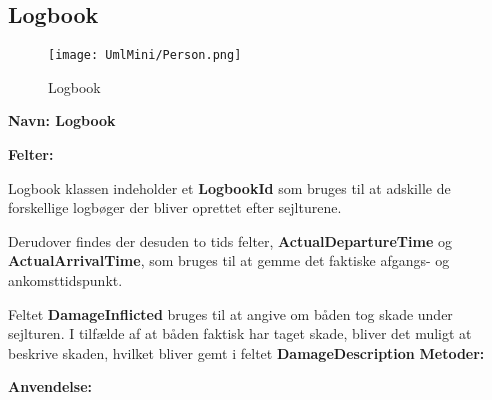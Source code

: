 \subsection*{Logbook}
\begin{wrapfigure}[9]{R}{0.25\textwidth}
    \label{img:logbook}
    \vspace{-20pt}
    \begin{center}
        \texttt{[image: UmlMini/Person.png]}
    \end{center}
    \vspace{-10pt}
    \caption{Logbook}
\end{wrapfigure}
\textbf{Navn: Logbook}

\textbf{Felter:}

Logbook klassen indeholder et \textbf{LogbookId} som bruges til at adskille de forskellige logbøger der bliver oprettet efter sejlturene. 

Derudover findes der desuden to tids felter, \textbf{ActualDepartureTime} og \textbf{ActualArrivalTime}, som bruges til at gemme det faktiske afgangs- og ankomsttidspunkt. 

Feltet \textbf{DamageInflicted} bruges til at angive om båden tog skade under sejlturen. I tilfælde af at båden faktisk har taget skade, bliver det muligt at beskrive skaden, hvilket bliver gemt i feltet \textbf{DamageDescription}
\textbf{Metoder:}

\textbf{Anvendelse:}

